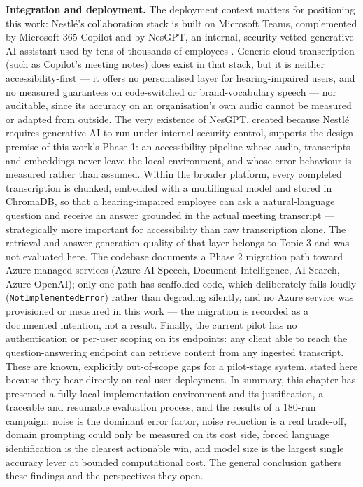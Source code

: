 \documentclass[12pt]{report}
\begin{document}
\textbf{Integration and deployment.} The deployment context matters for positioning this work: Nestl\'e's collaboration stack is built on Microsoft Teams, complemented by Microsoft 365 Copilot and by NesGPT, an internal, security-vetted generative-AI assistant used by tens of thousands of employees \cite{worklife2024nesgpt,arec2023nestle}. Generic cloud transcription (such as Copilot's meeting notes) does exist in that stack, but it is neither accessibility-first --- it offers no personalised layer for hearing-impaired users, and no measured guarantees on code-switched or brand-vocabulary speech --- nor auditable, since its accuracy on an organisation's own audio cannot be measured or adapted from outside. The very existence of NesGPT, created because Nestl\'e requires generative AI to run under internal security control, supports the design premise of this work's Phase 1: an accessibility pipeline whose audio, transcripts and embeddings never leave the local environment, and whose error behaviour is measured rather than assumed. Within the broader platform, every completed transcription is chunked, embedded with a multilingual model and stored in ChromaDB, so that a hearing-impaired employee can ask a natural-language question and receive an answer grounded in the actual meeting transcript --- strategically more important for accessibility than raw transcription alone. The retrieval and answer-generation quality of that layer belongs to Topic 3 and was not evaluated here. The codebase documents a Phase 2 migration path toward Azure-managed services (Azure AI Speech, Document Intelligence, AI Search, Azure OpenAI); only one path has scaffolded code, which deliberately fails loudly (\texttt{NotImplementedError}) rather than degrading silently, and no Azure service was provisioned or measured in this work --- the migration is recorded as a documented intention, not a result. Finally, the current pilot has no authentication or per-user scoping on its endpoints: any client able to reach the question-answering endpoint can retrieve content from any ingested transcript. These are known, explicitly out-of-scope gaps for a pilot-stage system, stated here because they bear directly on real-user deployment.
\vspace{0.5em}
In summary, this chapter has presented a fully local implementation environment and its justification, a traceable and resumable evaluation process, and the results of a 180-run campaign: noise is the dominant error factor, noise reduction is a real trade-off, domain prompting could only be measured on its cost side, forced language identification is the clearest actionable win, and model size is the largest single accuracy lever at bounded computational cost. The general conclusion gathers these findings and the perspectives they open.
\end{document}
